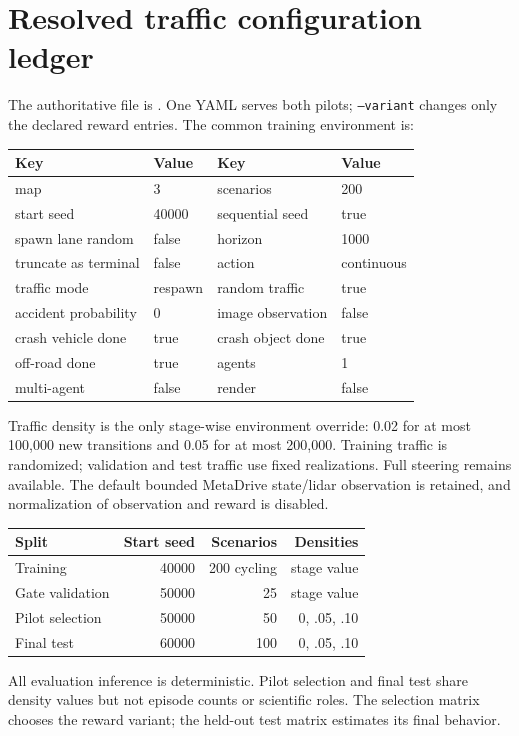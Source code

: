 \documentclass[10pt,twocolumn]{article}
\begin{document}
\section{Resolved traffic configuration ledger}
The authoritative file is . One YAML serves
both pilots; \texttt{--variant} changes only the declared reward entries. The common
training environment is:
\begin{center}\scriptsize
\setlength{\tabcolsep}{2pt}
\begin{tabular}{ll@{\quad}ll}
\toprule
Key & Value & Key & Value \\
\midrule
map & 3 & scenarios & 200 \\
start seed & 40000 & sequential seed & true \\
spawn lane random & false & horizon & 1000 \\
truncate as terminal & false & action & continuous \\
traffic mode & respawn & random traffic & true \\
accident probability & 0 & image observation & false \\
crash vehicle done & true & crash object done & true \\
off-road done & true & agents & 1 \\
multi-agent & false & render & false \\
\bottomrule
\end{tabular}
\end{center}
Traffic density is the only stage-wise environment override: 0.02 for at most 100,000
new transitions and 0.05 for at most 200,000. Training traffic is randomized; validation
and test traffic use fixed realizations. Full steering remains available. The default
bounded MetaDrive state/lidar observation is retained, and normalization of observation
and reward is disabled.

\begin{center}\footnotesize
\begin{tabular}{lrrr}
\toprule
Split & Start seed & Scenarios & Densities \\
\midrule
Training & 40000 & 200 cycling & stage value \\
Gate validation & 50000 & 25 & stage value \\
Pilot selection & 50000 & 50 & 0, .05, .10 \\
Final test & 60000 & 100 & 0, .05, .10 \\
\bottomrule
\end{tabular}
\end{center}
All evaluation inference is deterministic. Pilot selection and final test share density
values but not episode counts or scientific roles. The selection matrix chooses the
reward variant; the held-out test matrix estimates its final behavior.
\end{document}
